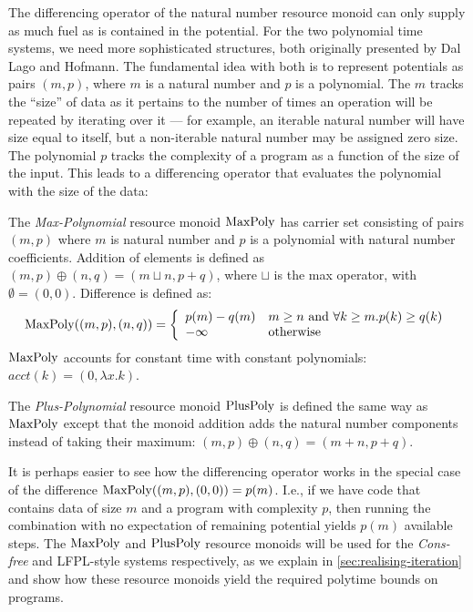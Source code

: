 \documentclass[acmsmall,review,screen,anonymous]{acmart}
\begin{document}
The differencing operator of the natural number resource monoid can
only supply as much fuel as is contained in the potential.
For the two polynomial time systems, we need more sophisticated
structures, both originally presented by Dal Lago and Hofmann. The
fundamental idea with both is to represent potentials as pairs
$(m,p)$, where $m$ is a natural number and $p$ is a polynomial. The
$m$ tracks the ``size'' of data as it pertains to the number of times
an operation will be repeated by iterating over it --- for example, an
iterable natural number will have size equal to itself, but a
non-iterable natural number may be assigned zero size. The polynomial
$p$ tracks the complexity of a program as a function of the size of
the input. This leads to a differencing operator that evaluates the
polynomial with the size of the data:

\begin{definition}\label{def:polynomial-resource-monoids}
  The \emph{Max-Polynomial} resource monoid $\mathrm{MaxPoly}$ has carrier set
  consisting of pairs $(m,p)$ where $m$ is natural number and $p$ is a
  polynomial with natural number coefficients. Addition of elements is
  defined as $(m,p) \oplus (n,q) = (m \sqcup n, p+q)$, where $\sqcup$
  is the max operator, with $\emptyset = (0,0)$. Difference is defined
  as:
  \begin{displaymath}
    \mathrm{MaxPoly}((m,p),(n,q)) = \left\{
      \begin{array}{ll}
        p(m) - q(m)&m \geq n \textrm{ and } \forall k \geq m. p(k) \geq q(k) \\
        - \infty & \textrm{otherwise}
      \end{array}
    \right.
  \end{displaymath}
  $\mathrm{MaxPoly}$ accounts for constant time with constant polynomials:
  $\mathit{acct}(k) = (0,\lambda x.k)$.

  The \emph{Plus-Polynomial} resource monoid $\mathrm{PlusPoly}$ is defined
  the same way as $\mathrm{MaxPoly}$ except that the monoid addition adds the
  natural number components instead of taking their maximum:
  $(m,p) \oplus (n,q) = (m + n, p+q)$.
\end{definition}

It is perhaps easier to see how the differencing operator works in the
special case of the difference $\mathrm{MaxPoly}((m,p),(0,0)) = p(m)$. I.e.,
if we have code that contains data of size $m$ and a program with
complexity $p$, then running the combination with no expectation of
remaining potential yields $p(m)$ available steps. The $\mathrm{MaxPoly}$ and
$\mathrm{PlusPoly}$ resource monoids will be used for the \emph{Cons-free} and
LFPL-style systems respectively, as we explain in
\autoref{sec:realising-iteration} and show how these resource monoids
yield the required polytime bounds on programs.
\end{document}
